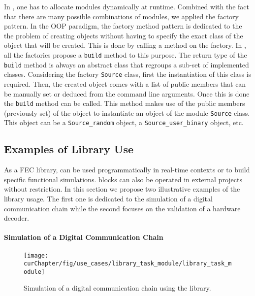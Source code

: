 In \AFFECT, one has to allocate modules dynamically at runtime. Combined with
the fact that there are many possible combinations of modules, we applied the
factory pattern. In the OOP paradigm, the factory method pattern is dedicated to
the the problem of creating objects without having to specify the exact class of
the object that will be created. This is done by calling a method on the
factory. In \AFFECT, all the factories propose a \verb|build| method to this
purpose. The return type of the \verb|build| method is always an abstract class
that regroups a sub-set of implemented classes. Considering the factory
\verb|Source| class, first the instantiation of this class is required. Then,
the created object comes with a list of public members that can be manually set
or deduced from the command line arguments. Once this is done the \verb|build|
method can be called. This method makes use of the public members (previously
set) of the object to instantiate an object of the module \verb|Source| class.
This object can be a \verb|Source_random| object, a \verb|Source_user_binary|
object, etc.

\subsection{Examples of Library Use}
\label{sec:aff3ct_library_example}

As a FEC library, \AFFECT can be used programmatically in real-time contexts or
to build specific functional simulations. \AFFECT blocks can also be operated in
external projects without restriction. In this section we propose two
illustrative examples of the \AFFECT library usage. The first one is dedicated
to the simulation of a digital communication chain while the second focuses on
the validation of a hardware decoder.

\paragraph{Simulation of a Digital Communication Chain}

\begin{figure}[htp]
  \centering
  \texttt{[image: \\curChapter/fig/use\_cases/library\_task\_module/library\_task\_module]}
  \caption{Simulation of a digital communication chain using the \AFFECT
    library.}
  \label{fig:aff3ct_library_task_module}
\end{figure}

